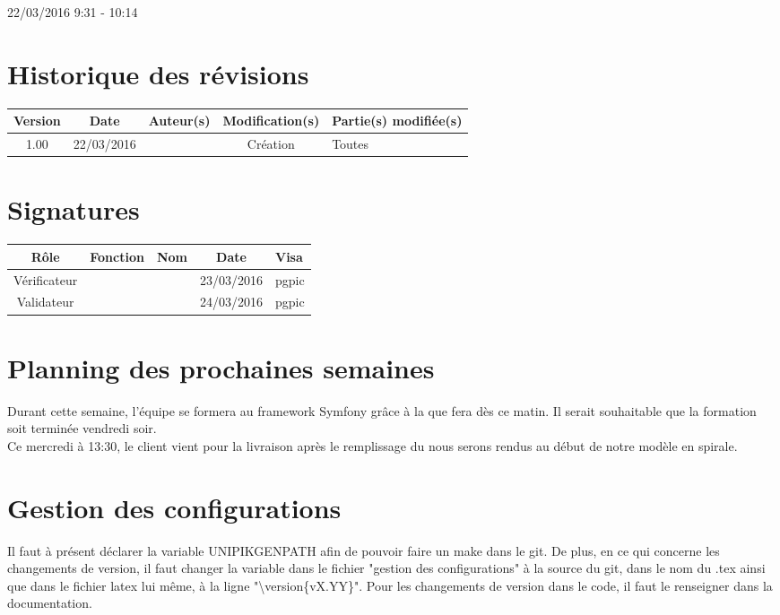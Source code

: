 \documentclass [a4paper] {article}
\begin{document}
22/03/2016			 				%
\hfill   
\hfill 	 9:31 - 10:14 				%



\section*{Historique des révisions}
\begin{center}
			\begin{tabular}{| c | c | c | c | p{4cm} |}
				\hline
				\rowcolor{Gray}
				Version & Date & Auteur(s) & Modification(s) & Partie(s) modifiée(s)		 \\
				\hline
				1.00 & 22/03/2016 & \Pierre & Création & Toutes \\
		\hline		
			\end{tabular}
		\end{center}

\section*{Signatures}

		\begin{center}
			\begin{tabular}{| c | c | c | c | p{4cm} |}
				\hline
				\rowcolor{Gray}
				Rôle & Fonction & Nom & Date & Visa		 \\
				\hline
				Vérificateur & \RQA & \Kafui & 23/03/2016 & pgpic \\[30pt]
				\hline
				Validateur & \CP & \Sergi & 24/03/2016 & pgpic \\[30pt]	
				\hline
			\end{tabular}
		\end{center}
		
\newpage		



\section{Planning des prochaines semaines}
Durant cette semaine, l'équipe se formera au framework Symfony grâce à la \FF{} que \Florian{} fera dès ce matin. Il serait souhaitable que la formation soit terminée vendredi soir. \\
Ce mercredi à 13:30, le client vient pour la livraison après le remplissage du \CDR{} nous serons rendus au début de notre modèle en spirale.


\section{Gestion des configurations}
Il faut à présent déclarer la variable UNIPIKGENPATH afin de pouvoir faire un make dans le git. De plus, en ce qui concerne les changements de version, il faut changer la variable dans le fichier "gestion des configurations" à la source du git, dans le nom du .tex ainsi que dans le fichier latex lui même, à la ligne "\textbackslash version\{vX.YY\}".
Pour les changements de version dans le code, il faut le renseigner dans la documentation.
\end{document}

